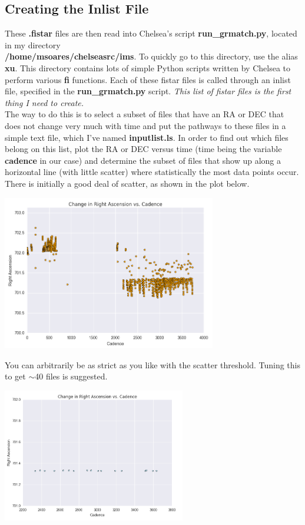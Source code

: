\documentclass[11pt,letterpaper]{book} %
\begin{document}
\subsection*{Creating the Inlist File}
These \textbf{.fistar} files are then read into Chelsea's script \textbf{run\_grmatch.py}, located in my directory \\  \textbf{/home/msoares/chelseasrc/ims}. To quickly go to this directory, use the alias \textbf{xu}. 
This directory contains lots of simple Python scripts written by Chelsea to perform various \textbf{fi} functions.
Each of these fistar files is called through an inlist file, specified in the \textbf{run\_grmatch.py} script. 
\textit{This list of fistar files is the first thing I need to create.} \\ 
The way to do this is to select a subset of files that have an RA or DEC that does not change very much with time and put the pathways to these files in a simple text file, which I've named \textbf{inputlist.ls}. 
In order to find out which files belong on this list, plot the RA or DEC versus time (time being the variable \textbf{cadence} in our case) and determine the subset of files that show up along a horizontal line (with little scatter) where statistically the most data points occur. 
There is initially a good deal of scatter, as shown in the plot below.
\begin{center}
\includegraphics[width=0.7\textwidth]{scatter.png}
\end{center}
You can arbitrarily be as strict as you like with the scatter threshold. Tuning this to get $\sim$40 files is suggested.\\
\begin{center}
\includegraphics[width=0.6\textwidth]{line.png}
\end{center}
\end{document}
